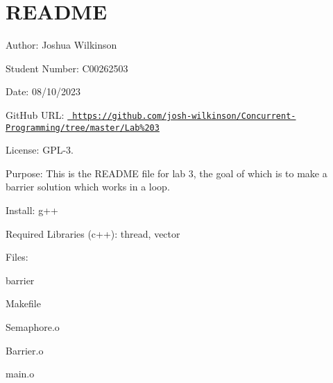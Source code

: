\chapter{README}
\hypertarget{md__r_e_a_d_m_e}{}\label{md__r_e_a_d_m_e}
\label{md__r_e_a_d_m_e_autotoc_md0}%
%
 Author\+: Joshua Wilkinson

Student Number\+: C00262503

Date\+: 08/10/2023

Git\+Hub URL\+: \href{https://github.com/josh-wilkinson/Concurrent-Programming/tree/master/Lab\%203}{\texttt{ https\+://github.\+com/josh-\/wilkinson/\+Concurrent-\/\+Programming/tree/master/\+Lab\%203}}

License\+: GPL-\/3.

Purpose\+: This is the README file for lab 3, the goal of which is to make a barrier solution which works in a loop.

Install\+: g++

Required Libraries (c++)\+: thread, vector

Files\+:
\begin{DoxyItemize}
\item barrier
\item {}
\item {}
\item Makefile
\item {}
\item Semaphore.\+o
\item {}
\item Barrier.\+o
\item main.\+o
\item {}
\item {} 
\end{DoxyItemize}